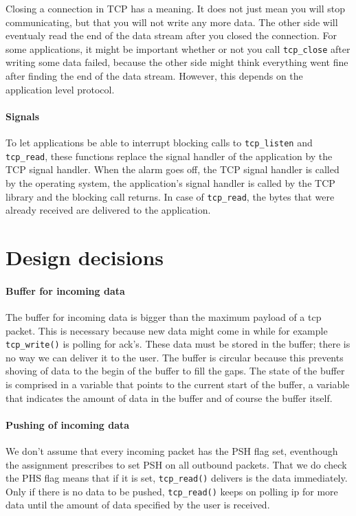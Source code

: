 \documentclass[11pt]{article}
\begin{document}
Closing a connection in TCP has a meaning. It does not just mean you
will stop communicating, but that you will not write any more data. The other
side will eventualy read the end of the data stream after you closed the
connection. For some applications, it might be important whether or not you
call \lstinline|tcp_close| after writing some data failed, because the other
side might think everything went fine after finding the end of the data
stream. However, this depends on the application level protocol.

\paragraph{Signals}

To let applications be able to interrupt blocking calls to
\lstinline|tcp_listen| and \lstinline|tcp_read|, these functions replace the
signal handler of the application by the TCP signal handler. When the alarm
goes off, the TCP signal handler is called by the operating system, the
application's signal handler is called by the TCP library and the blocking
call returns. In case of \lstinline|tcp_read|, the bytes that were already
received are delivered to the application.


\section{Design decisions}


\paragraph{Buffer for incoming data}
    The buffer for incoming data is bigger than the maximum payload of a tcp
    packet. This is necessary because new data might come in while for example 
    \lstinline|tcp_write()| is polling for ack's. These data must be stored in the 
    buffer; 
    there is no way we can deliver it to the user.
    The buffer is circular because this prevents shoving of data to the begin of 
    the buffer to fill the gaps. 
    The state of the buffer is comprised in a variable that points to the 
    current start of the buffer, a variable that indicates the amount of data in 
    the buffer and of course the buffer itself.    

\paragraph{Pushing of incoming data}
    We don't assume that every incoming packet has the PSH flag set, eventhough 
    the assignment prescribes to set PSH on all outbound packets. That we do
    check the PHS flag means 
    that if it is set, \lstinline|tcp_read()| delivers is the data immediately.
    Only if there is no data to be pushed, \lstinline|tcp_read()| keeps on polling 
    ip for 
    more data until the amount of data specified by the user is received.
    
\end{document}
